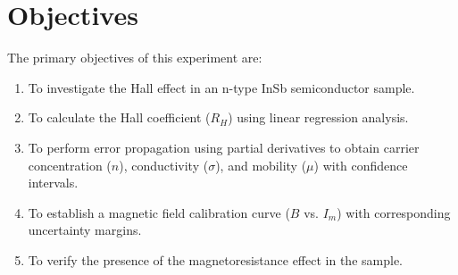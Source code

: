 \documentclass[a4paper,11pt]{article}
\begin{document}
\begin{abstract}
In this report, the Hall effect is studied in an n-type Indium Antimonide (InSb) semiconductor crystal using rigorous error analysis and advanced statistical techniques. Rather than reporting point estimates, all variables and parameters are calculated as confidence intervals ($x \pm \delta x$) based on instrumental tolerances, Ordinary Least Squares (OLS) regression standard errors, and partial derivative error propagation. The average Hall coefficient is found to be $R_H = (-4.36 \pm 0.09) \times 10^{-4} \text{ m}^3/\text{C}$, yielding a majority charge carrier density of $n = (1.43 \pm 0.03) \times 10^{22} \text{ m}^{-3}$. The residual magnetic field of the electromagnet at zero coil current is calculated to be $B_0 = 0.0277 \pm 0.0008\text{ T} = 277 \pm 8\text{ G}$. The magnetoresistance effect is analyzed, obtaining longitudinal sample resistances of $R_1 = 6.378 \pm 0.010\ \Omega$ (at $0\text{ A}$), $R_2 = 6.428 \pm 0.008\ \Omega$ (at $1\text{ A}$), and $R_3 = 6.468 \pm 0.011\ \Omega$ (at $2\text{ A}$), confirming a statistically significant positive magnetoresistance. The electrical conductivity and mobility are determined as $\bar{\sigma} = 675 \pm 16\text{ S/m}$ and $\bar{\mu} = 0.294 \pm 0.009\text{ m}^2/(\text{V s})$, respectively. All scatter plots are visualised with horizontal and vertical error bars alongside their OLS best-fit lines.
\end{abstract}

\section{Objectives}
The primary objectives of this experiment are:
\begin{enumerate}
    \item To investigate the Hall effect in an n-type InSb semiconductor sample.
    \item To calculate the Hall coefficient ($R_H$) using linear regression analysis.
    \item To perform error propagation using partial derivatives to obtain carrier concentration ($n$), conductivity ($\sigma$), and mobility ($\mu$) with confidence intervals.
    \item To establish a magnetic field calibration curve ($B$ vs. $I_m$) with corresponding uncertainty margins.
    \item To verify the presence of the magnetoresistance effect in the sample.
\end{enumerate}
\end{document}

